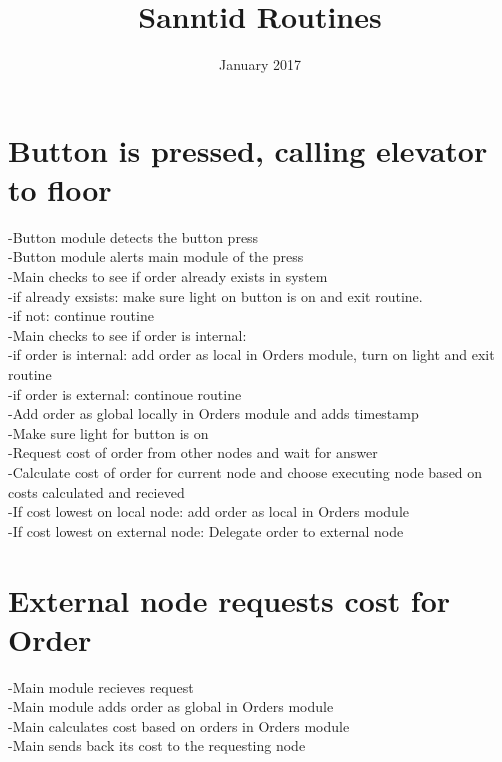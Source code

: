\documentclass{article}
\title{Sanntid Routines}
\author{ }
\date{January 2017}
\begin{document}

\maketitle

\section{Button is pressed, calling elevator to floor}
-Button module detects the button press\\
-Button module alerts main module of the press\\
-Main checks to see if order already exists in system\\
    \tab -if already exsists: make sure light on button is on and exit routine.\\
    \tab -if not: continue routine\\
-Main checks to see if order is internal:\\
   \tab  -if order is internal: add order as local in Orders module, turn on light and exit routine\\
    \tab -if order is external: continoue routine\\
-Add order as global locally in Orders module and adds timestamp\\
-Make sure light for button is on\\
-Request cost of order from other nodes and wait for answer\\
-Calculate cost of order for current node and choose executing node based on costs calculated and recieved\\
   \tab  -If cost lowest on local node: add order as local in Orders module\\
    \tab -If cost lowest on external node:  Delegate order to external node\\

\section{External node requests cost for Order}
-Main module recieves request\\
-Main module adds order as global in Orders module\\
-Main calculates cost based on orders in Orders module\\
-Main sends back its cost to the requesting node\\
\end{document}
